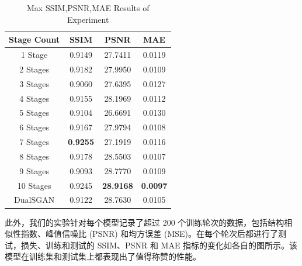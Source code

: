 \documentclass[twocolumn]{article}
\begin{document}
\begin{table}[h]
	\centering
	\caption{Max SSIM,PSNR,MAE Results of Experiment}
	\label{tab:exps_result}
	\begin{tabular}{cccc}
		\toprule
		Stage Count & SSIM            & PSNR             & MAE             \\
		\midrule
		1 Stage     & 0.9149          & 27.7411          & 0.0119          \\
		2 Stages    & 0.9182          & 27.9950          & 0.0109          \\
		3 Stages    & 0.9060          & 27.6395          & 0.0127          \\
		4 Stages    & 0.9155          & 28.1969          & 0.0112          \\
		5 Stages    & 0.9104          & 26.6691          & 0.0130          \\
		6 Stages    & 0.9167          & 27.9794          & 0.0108          \\
		7 Stages    & \textbf{0.9255} & 27.1919          & 0.0116          \\
		8 Stages    & 0.9178          & 28.5503          & 0.0107          \\
		9 Stages    & 0.9093          & 28.7770          & 0.0109          \\
		10 Stages   & 0.9245          & \textbf{28.9168} & \textbf{0.0097} \\
		DualSGAN    & 0.9122          & 28.7630          & 0.0105          \\
		\bottomrule
	\end{tabular}
\end{table}

此外，我们的实验针对每个模型记录了超过 200 个训练轮次的数据，包括结构相似性指数、峰值信噪比 (PSNR) 和均方误差 (MSE)。在每个轮次后都进行了测试，损失、训练和测试的 SSIM、PSNR 和 MAE 指标的变化如各自的图所示。该模型在训练集和测试集上都表现出了值得称赞的性能。
\end{document}

